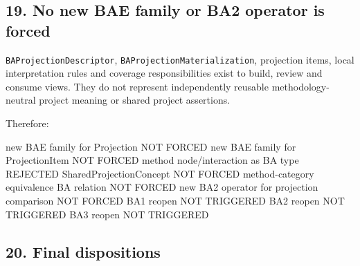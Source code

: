 \documentclass[
  11pt,
  a4paper,
]{article}
\newenvironment{Shaded}{}{}
\newcommand{\NormalTok}[1]{#1}
\begin{document}
\subsection{19. No new BAE family or BA2 operator is
forced}\label{no-new-bae-family-or-ba2-operator-is-forced}

\texttt{BAProjectionDescriptor}, \texttt{BAProjectionMaterialization},
projection items, local interpretation rules and coverage
responsibilities exist to build, review and consume views. They do not
represent independently reusable methodology-neutral project meaning or
shared project assertions.

Therefore:

\begin{Shaded}
\begin{Highlighting}[]
\NormalTok{new BAE family for Projection                     NOT FORCED}
\NormalTok{new BAE family for ProjectionItem                 NOT FORCED}
\NormalTok{method node/interaction as BA type                REJECTED}
\NormalTok{SharedProjectionConcept                           NOT FORCED}
\NormalTok{method{-}category equivalence BA relation           NOT FORCED}
\NormalTok{new BA2 operator for projection comparison        NOT FORCED}
\NormalTok{BA1 reopen                                        NOT TRIGGERED}
\NormalTok{BA2 reopen                                        NOT TRIGGERED}
\NormalTok{BA3 reopen                                        NOT TRIGGERED}
\end{Highlighting}
\end{Shaded}

\subsection{20. Final dispositions}\label{final-dispositions}
\end{document}
